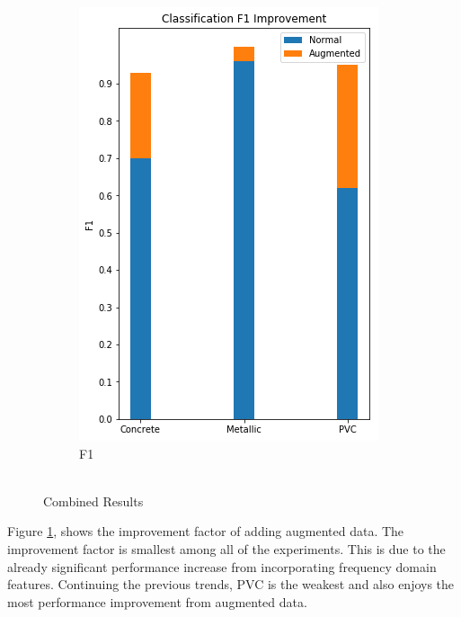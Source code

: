 \begin{figure}[H]
\begin{subfigure}[b]{0.4\linewidth}
    \includegraphics[width=\linewidth]{figures/Combined-F1.png}
    \caption{F1}
  \end{subfigure}
  \vspace{\baselineskip}
  \caption{\\Combined Results}
  \label{fig:combined-results}
\end{figure}

\hspace{0.5in} Figure \ref{fig:combined-results}, shows the improvement factor of adding augmented data. The improvement factor is smallest among all of the experiments. This is due to the already significant performance increase from incorporating frequency domain features. Continuing the previous trends, PVC is the weakest and also enjoys the most performance improvement from augmented data. 

